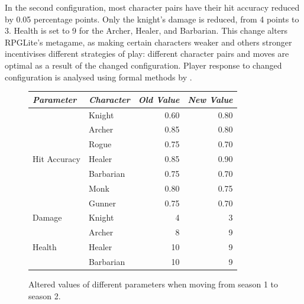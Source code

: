 In the second configuration, most character pairs have their hit accuracy
reduced by 0.05 percentage points. Only the knight's damage is reduced, from 4
points to 3. Health is set to 9 for the Archer, Healer, and Barbarian. This
change alters RPGLite's metagame, as making certain characters weaker and others
stronger incentivises different strategies of play: different character pairs
and moves are optimal as a result of the changed configuration. Player response
to changed configuration is analysed using formal methods by
\citet{kavanagh2021thesis}.



\begin{figure}[h]
  \centering
  \begin{tabular}{@{}l l r r@{}@{}}
    \toprule
    \emph{Parameter} & \emph{Character} & \emph{Old Value} & \emph{New Value} \\
    \midrule
    \multirow{7}{*}{Hit Accuracy} & Knight    & 0.60 & 0.80 \\
                                  & Archer    & 0.85 & 0.80 \\
                                  & Rogue     & 0.75 & 0.70 \\
                                  & Healer    & 0.85 & 0.90 \\
                                  & Barbarian & 0.75 & 0.70 \\
                                  & Monk      & 0.80 & 0.75 \\
                                  & Gunner    & 0.75 & 0.70 \\
    \midrule
    \multirow{1}{*}{Damage}       & Knight    & 4    & 3    \\
    \midrule
    \multirow{3}{*}{Health}       & Archer    & 8    & 9    \\
                                  & Healer    & 10   & 9    \\
                                  & Barbarian & 10   & 9    \\
    \bottomrule
  \end{tabular}
  \caption{Altered values of different parameters when moving from season 1 to season 2.}
  \label{fig:changes_between_seasons}
\end{figure}
